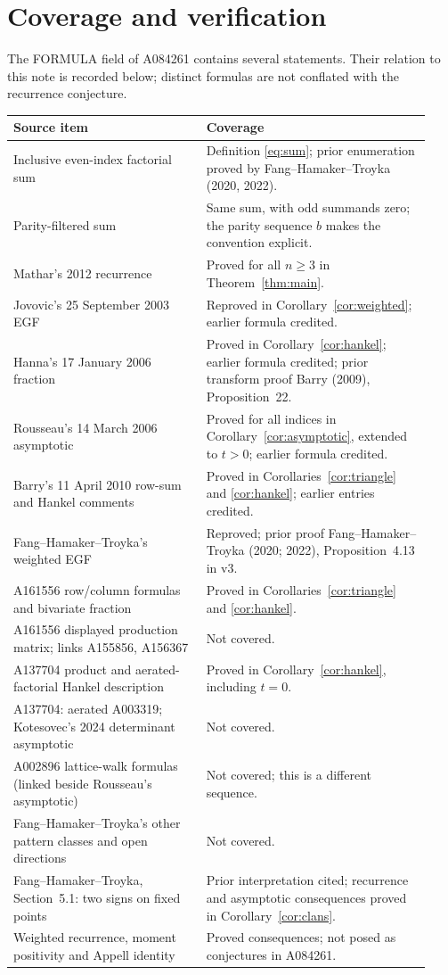\documentclass[11pt]{article}
\begin{document}
\section{Coverage and verification}
The FORMULA field of A084261 contains several statements. Their relation
to this note is recorded below; distinct formulas are not conflated with
the recurrence conjecture.

\begingroup\small
\begin{longtable}{@{}p{0.43\linewidth}p{0.50\linewidth}@{}}
\toprule
Source item & Coverage \\
\midrule
Inclusive even-index factorial sum & Definition \eqref{eq:sum}; prior
enumeration proved by Fang--Hamaker--Troyka (2020, 2022). \\
Parity-filtered sum & Same sum, with odd summands zero; the parity
sequence $b$ makes the convention explicit. \\
Mathar's 2012 recurrence & Proved for all $n\geq3$ in Theorem~\ref{thm:main}. \\
Jovovic's 25 September 2003 EGF & Reproved in
Corollary~\ref{cor:weighted}; earlier formula credited. \\
Hanna's 17 January 2006 fraction & Proved in
Corollary~\ref{cor:hankel}; earlier formula credited;
prior transform proof Barry (2009), Proposition~22. \\
Rousseau's 14 March 2006 asymptotic & Proved for all indices in
Corollary~\ref{cor:asymptotic}, extended to $t>0$; earlier formula credited. \\
Barry's 11 April 2010 row-sum and Hankel comments & Proved in
Corollaries~\ref{cor:triangle} and \ref{cor:hankel}; earlier entries credited. \\
Fang--Hamaker--Troyka's weighted EGF & Reproved; prior proof
Fang--Hamaker--Troyka (2020; 2022), Proposition~4.13 in v3. \\
A161556 row/column formulas and bivariate fraction & Proved in
Corollaries~\ref{cor:triangle} and \ref{cor:hankel}. \\
A161556 displayed production matrix; links A155856, A156367 &
Not covered. \\
A137704 product and aerated-factorial Hankel description & Proved in
Corollary~\ref{cor:hankel}, including $t=0$. \\
A137704: aerated A003319; Kotesovec's 2024 determinant asymptotic &
Not covered. \\
A002896 lattice-walk formulas (linked beside Rousseau's asymptotic) &
Not covered; this is a different sequence. \\
Fang--Hamaker--Troyka's other pattern classes and open directions &
Not covered. \\
Fang--Hamaker--Troyka, Section~5.1: two signs on fixed points &
Prior interpretation cited; recurrence and asymptotic consequences
proved in Corollary~\ref{cor:clans}. \\
Weighted recurrence, moment positivity and Appell identity &
Proved consequences; not posed as conjectures in A084261. \\
\bottomrule
\end{longtable}
\endgroup
\end{document}
